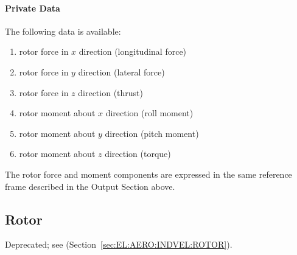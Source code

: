 \paragraph{Private Data}
The following data is available:
\begin{enumerate}
\item {} rotor force in $x$ direction (longitudinal force)
\item {} rotor force in $y$ direction (lateral force)
\item {} rotor force in $z$ direction (thrust)
\item {} rotor moment about $x$ direction (roll moment)
\item {} rotor moment about $y$ direction (pitch moment)
\item {} rotor moment about $z$ direction (torque)
\end{enumerate}
The rotor force and moment components are expressed in the same reference
frame described in the Output Section above.



\subsection{Rotor}
\label{sec:EL:AERO:ROTOR}
Deprecated; see  (Section~\ref{sec:EL:AERO:INDVEL:ROTOR}).

